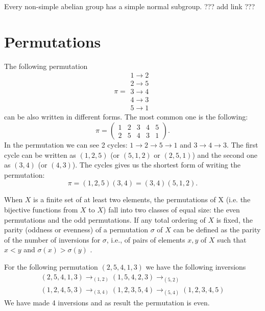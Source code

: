 \begin{appendices}
\begin{theorem}
  Every non-simple abelian group has a simple normal subgroup.
  ??? add link ???
  \label{thm:simple_subgroup_of_abelian}
\end{theorem}
  
\section{Permutations}

\begin{example}[Permutation]
  The following permutation
  \[ \pi = 
    \begin{array}{c}
    1 \to 2 \\
    2 \to 5 \\
    3 \to 4 \\
    4 \to 3 \\
    5 \to 1 
    \end{array}
    \]
    can be also written in different forms. The most common one is the following:
    \[
    \pi = \begin{pmatrix}
      1 & 2 & 3 & 4 & 5 \\
      2 & 5 & 4 & 3 & 1
    \end{pmatrix}.
    \]
    In the permutation we can see 2 cycles:
    $1 \to 2 \to 5 \to 1$ and $3 \to 4 \to 3$. The first cycle can be
    written as $(1,2,5)$ (or $(5,1,2)$ or $(2,5,1)$) and the second
    one as $(3,4)$ (or $(4,3)$). The cycles gives us the shortest form
    of writing the permutation:
    \[
    \pi = (1,2,5)(3,4) = (3,4)(5,1,2).
    \]
  \label{ex:permutation}
\end{example}

\begin{definition}
  When $X$ is a finite set of at least two elements, the permutations of
  X (i.e. the bijective functions from $X$ to $X$) fall into two classes
  of equal size: the even permutations and the odd permutations. If
  any total ordering of $X$ is fixed, the parity (oddness or evenness)
  of a permutation $\sigma$ of $X$ can be defined as the
  parity of the number of inversions for $\sigma$, i.e., of pairs of elements
  $x, y$ of $X$ such that $x < y$ and $\sigma (x) > \sigma (y)$
  \cite{wiki:paritypermutation}.
  \label{def:paritypermutation}
\end{definition}

\begin{example}
  For the following permutation $(2,5,4,1,3)$ we have the following
  inversions
  \begin{eqnarray}
    (2,5,4,1,3) \to_{(1,2)}
    (1,5,4,2,3) \to_{(5,2)}
    \nonumber \\
    (1,2,4,5,3) \to_{(3,4)}
    (1,2,3,5,4) \to_{(5,4)}
    (1,2,3,4,5)
    \nonumber
  \end{eqnarray}
  We have made 4 inversions and as result the permutation is even.
  \label{ex:paritypermutation}
\end{example}


\end{appendices}
